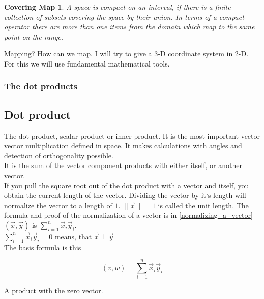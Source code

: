 \documentclass[a4paper]{article}
\begin{document}
\newtheorem{Covering Map}{Covering Map}
\begin{Covering Map}
A space is compact on an interval, if there is a finite collection of subsets covering the space by their union. In terms of a compact operator there are more than one items from the domain which map to the same point on the range.
\end{Covering Map}



Mapping? How can we map. I will try to give a 3-D coordinate system in 2-D. For this we will use fundamental mathematical tools.

\subsubsection{The dot products}


 \subsection{Dot product}

The dot product, scalar product or inner product.
It is the most important vector vector multiplication defined in space.
It makes calculations with angles and detection of orthogonality possible.\\

It is the sum of the vector component products with either itself, or another vector.\\

If you pull the square root out of the dot product with a vector and itself, you obtain the current length of the vector.
Dividing the vector by it`s length will normalize the vector to a length of $1$. $\|\vec{x}\| = 1$ is called the unit length.
The formula and proof of the normalization of a vector is in \ref{normalizing_a_vector}\\

$(\vec{x}, \vec{y})$ is $\sum_{i=1}^{n}\vec{x}_{i}\vec{y}_{i}$.  \\

$\sum_{i=1}^{n}\vec{x}_{i}\vec{y}_{i} = 0$ means, that $\vec{x} \perp \vec{y}$ \\

The basis formula is this

\begin{displaymath}
    (v,w) = \sum_{i=1}^{n}\vec{x}_{i}\vec{y}_{i}
\end{displaymath}

A product with the zero vector.
\end{document}
